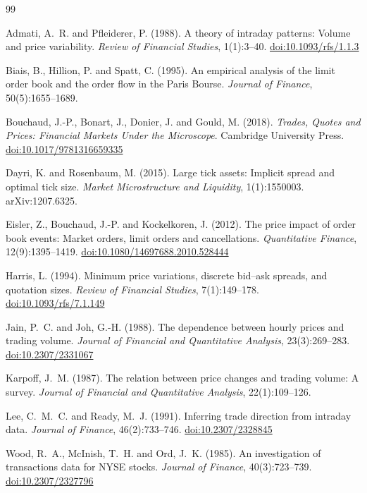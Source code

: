\documentclass[11pt,a4paper]{article}
\begin{document}
\newcommand{\doi}[1]{\href{https://doi.org/#1}{doi:#1}}
\begin{thebibliography}{99}\setlength{\itemsep}{1pt}\small

Admati, A.~R. and Pfleiderer, P. (1988). A theory of intraday patterns: Volume and price
variability. \emph{Review of Financial Studies}, 1(1):3--40. \doi{10.1093/rfs/1.1.3}

Biais, B., Hillion, P. and Spatt, C. (1995). An empirical analysis of the limit order book and the
order flow in the Paris Bourse. \emph{Journal of Finance}, 50(5):1655--1689.

Bouchaud, J.-P., Bonart, J., Donier, J. and Gould, M. (2018). \emph{Trades, Quotes and Prices:
Financial Markets Under the Microscope}. Cambridge University Press. \doi{10.1017/9781316659335}

Dayri, K. and Rosenbaum, M. (2015). Large tick assets: Implicit spread and optimal tick size.
\emph{Market Microstructure and Liquidity}, 1(1):1550003. arXiv:1207.6325.

Eisler, Z., Bouchaud, J.-P. and Kockelkoren, J. (2012). The price impact of order book events:
Market orders, limit orders and cancellations. \emph{Quantitative Finance}, 12(9):1395--1419.
\doi{10.1080/14697688.2010.528444}

Harris, L. (1994). Minimum price variations, discrete bid--ask spreads, and quotation sizes.
\emph{Review of Financial Studies}, 7(1):149--178. \doi{10.1093/rfs/7.1.149}

Jain, P.~C. and Joh, G.-H. (1988). The dependence between hourly prices and trading volume.
\emph{Journal of Financial and Quantitative Analysis}, 23(3):269--283. \doi{10.2307/2331067}

Karpoff, J.~M. (1987). The relation between price changes and trading volume: A survey.
\emph{Journal of Financial and Quantitative Analysis}, 22(1):109--126.

Lee, C.~M.~C. and Ready, M.~J. (1991). Inferring trade direction from intraday data.
\emph{Journal of Finance}, 46(2):733--746. \doi{10.2307/2328845}

Wood, R.~A., McInish, T.~H. and Ord, J.~K. (1985). An investigation of transactions data for NYSE
stocks. \emph{Journal of Finance}, 40(3):723--739. \doi{10.2307/2327796}

\end{thebibliography}
\end{document}
